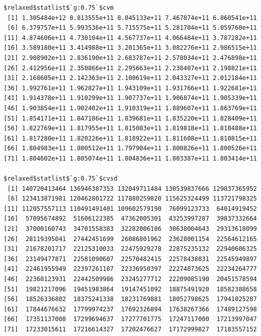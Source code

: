 \documentclass[
]{article}
\begin{document}
\begin{verbatim}
$relaxed$statlist$`g:0.75`$cvm
 [1] 1.305484e+12 8.813555e+11 8.045133e+11 7.467874e+11 6.860541e+11
 [6] 6.379757e+11 5.993536e+11 5.715575e+11 5.281704e+11 5.059760e+11
[11] 4.874606e+11 4.730104e+11 4.567737e+11 4.066484e+11 3.787282e+11
[16] 3.589180e+11 3.414988e+11 3.201365e+11 3.082276e+11 2.986515e+11
[21] 2.908902e+11 2.836190e+11 2.683787e+11 2.578034e+11 2.476898e+11
[26] 2.412956e+11 2.350866e+11 2.295663e+11 2.238407e+11 2.198821e+11
[31] 2.168605e+11 2.142363e+11 2.100619e+11 2.043327e+11 2.012184e+11
[36] 1.992761e+11 1.962827e+11 1.943109e+11 1.931766e+11 1.922681e+11
[41] 1.914378e+11 1.910299e+11 1.907737e+11 1.906874e+11 1.905339e+11
[46] 1.903854e+11 1.902402e+11 1.910319e+11 1.889607e+11 1.863769e+11
[51] 1.854171e+11 1.847186e+11 1.839681e+11 1.835220e+11 1.828409e+11
[56] 1.822769e+11 1.817955e+11 1.815083e+11 1.819818e+11 1.818488e+11
[61] 1.817280e+11 1.820226e+11 1.818922e+11 1.811608e+11 1.810815e+11
[66] 1.804983e+11 1.800512e+11 1.797904e+11 1.800826e+11 1.800526e+11
[71] 1.804602e+11 1.805074e+11 1.804836e+11 1.803387e+11 1.803414e+11

$relaxed$statlist$`g:0.75`$cvsd
 [1] 140720413464 136946387353 132049711484 130539837666 129837365952
 [6] 123413871981 120462801722 117880259820 115625324499 113721798325
[11] 112057557113 110491491401 109602579190  76099123733  64014919452
[16]  57095674892  51606122385  47362005301  43253997287  39837332664
[21]  37000160743  34701558383  32282006106  30638004643  29313618099
[26]  28119395041  27442451699  26086801962  23628001154  22564612165
[31]  21678201717  22125310033  22475929278  22875235132  22940606325
[36]  23149477871  22581090607  22570482415  22578438031  22545949897
[41]  22461955949  22397261187  22336950397  22274873625  22234264777
[46]  22368123931  22442509986  23245277712  22209085190  20451578594
[51]  19821217096  19451983864  19147451092  18875491920  18582388658
[56]  18526336802  18375241338  18231769881  18052798625  17941025287
[61]  17844676632  17799974237  17692326894  17638267366  17489127598
[66]  17351137008  17299694637  17277701775  17247117000  17213997047
[71]  17233015611  17216614327  17202476627  17172999827  17183557152


\end{verbatim}
\end{document}
